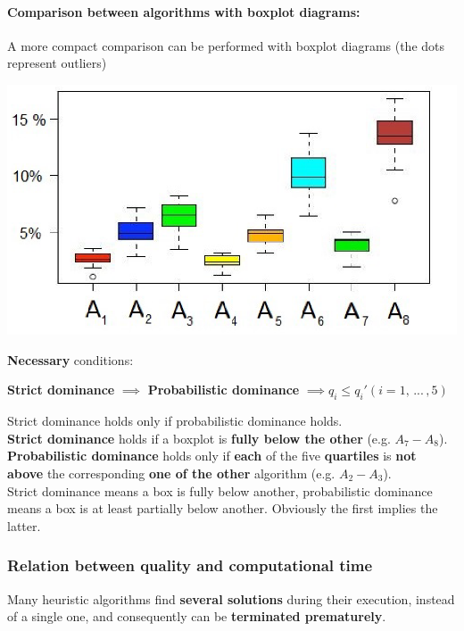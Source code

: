 \paragraph{Comparison between algorithms with boxplot diagrams:} A more compact comparison can be performed with boxplot diagrams (the dots represent outliers)
\begin{center}
	\includegraphics[width=0.9\columnwidth]{img/boxplot2}
\end{center}
\textbf{Necessary} conditions:
\begin{center}
	\textbf{Strict dominance} $\implies$ \textbf{Probabilistic dominance} $\implies q_i \leq q_i ' (i = 1, \, ... \, , 5)$
\end{center}
Strict dominance holds only if probabilistic dominance holds. \\

\textbf{Strict dominance} holds if a boxplot is \textbf{fully below the other} (e.g. $A_7 - A_8$).\\

\textbf{Probabilistic dominance} holds only if \textbf{each} of the five \textbf{quartiles} is \textbf{not above} the corresponding \textbf{one of the other} algorithm (e.g. $A_2 - A_3$).\\

Strict dominance means a box is fully below another, probabilistic dominance means a box is at least partially below another. Obviously the first implies the latter.\\

\newpage

\subsubsection{Relation between quality and computational time}
Many heuristic algorithms find \textbf{several solutions} during their execution, instead of a single one, and consequently can be \textbf{terminated prematurely}.\\

